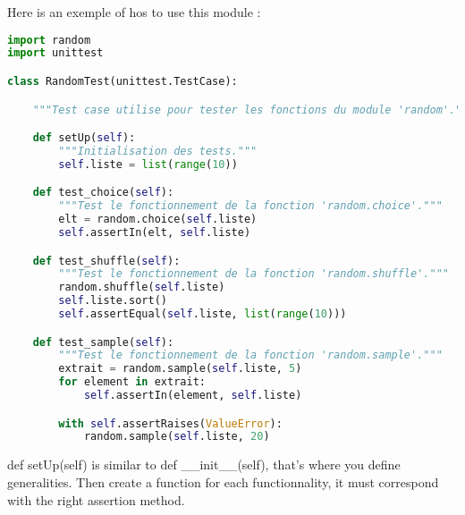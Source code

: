 \documentclass[a4paper, 12pt, titlepage]{scrartcl} %
\begin{document}
Here is an exemple of hos to use this module :
\begin{lstlisting}[language=Python]
import random
import unittest

class RandomTest(unittest.TestCase):

    """Test case utilise pour tester les fonctions du module 'random'."""

    def setUp(self):
        """Initialisation des tests."""
        self.liste = list(range(10))

    def test_choice(self):
        """Test le fonctionnement de la fonction 'random.choice'."""
        elt = random.choice(self.liste)
        self.assertIn(elt, self.liste)

    def test_shuffle(self):
        """Test le fonctionnement de la fonction 'random.shuffle'."""
        random.shuffle(self.liste)
        self.liste.sort()
        self.assertEqual(self.liste, list(range(10)))

    def test_sample(self):
        """Test le fonctionnement de la fonction 'random.sample'."""
        extrait = random.sample(self.liste, 5)
        for element in extrait:
            self.assertIn(element, self.liste)

        with self.assertRaises(ValueError):
            random.sample(self.liste, 20)
\end{lstlisting} \vspace{5mm}
def setUp(self) is similar to def \_\_init\_\_(self), that's where you define generalities.
Then create a function for each functionnality, it must correspond with the right assertion method.
\end{document}
